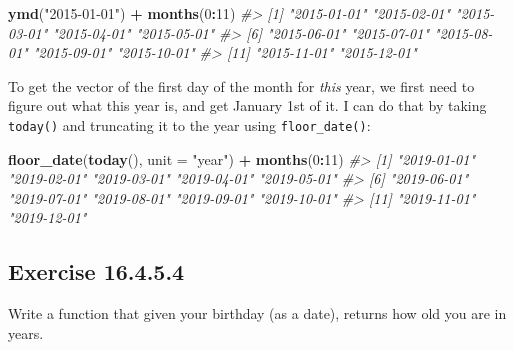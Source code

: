 \documentclass[]{book}
\newenvironment{Shaded}{\begin{snugshade}}{\end{snugshade}}
\newcommand{\CommentTok}[1]{\textcolor[rgb]{0.56,0.35,0.01}{\textit{#1}}}
\newcommand{\ControlFlowTok}[1]{\textcolor[rgb]{0.13,0.29,0.53}{\textbf{#1}}}
\newcommand{\DataTypeTok}[1]{\textcolor[rgb]{0.13,0.29,0.53}{#1}}
\newcommand{\DecValTok}[1]{\textcolor[rgb]{0.00,0.00,0.81}{#1}}
\newcommand{\KeywordTok}[1]{\textcolor[rgb]{0.13,0.29,0.53}{\textbf{#1}}}
\newcommand{\NormalTok}[1]{#1}
\newcommand{\OperatorTok}[1]{\textcolor[rgb]{0.81,0.36,0.00}{\textbf{#1}}}
\newcommand{\StringTok}[1]{\textcolor[rgb]{0.31,0.60,0.02}{#1}}
\theoremstyle{plain}
\theoremstyle{remark}
\begin{document}
\begin{Shaded}
\begin{Highlighting}[]
\KeywordTok{ymd}\NormalTok{(}\StringTok{"2015-01-01"}\NormalTok{) }\OperatorTok{+}\StringTok{ }\KeywordTok{months}\NormalTok{(}\DecValTok{0}\OperatorTok{:}\DecValTok{11}\NormalTok{)}
\CommentTok{#>  [1] "2015-01-01" "2015-02-01" "2015-03-01" "2015-04-01" "2015-05-01"}
\CommentTok{#>  [6] "2015-06-01" "2015-07-01" "2015-08-01" "2015-09-01" "2015-10-01"}
\CommentTok{#> [11] "2015-11-01" "2015-12-01"}
\end{Highlighting}
\end{Shaded}

To get the vector of the first day of the month for \emph{this} year, we first need to figure out what this year is, and get January 1st of it.
I can do that by taking \texttt{today()} and truncating it to the year using \texttt{floor\_date()}:

\begin{Shaded}
\begin{Highlighting}[]
\KeywordTok{floor_date}\NormalTok{(}\KeywordTok{today}\NormalTok{(), }\DataTypeTok{unit =} \StringTok{"year"}\NormalTok{) }\OperatorTok{+}\StringTok{ }\KeywordTok{months}\NormalTok{(}\DecValTok{0}\OperatorTok{:}\DecValTok{11}\NormalTok{)}
\CommentTok{#>  [1] "2019-01-01" "2019-02-01" "2019-03-01" "2019-04-01" "2019-05-01"}
\CommentTok{#>  [6] "2019-06-01" "2019-07-01" "2019-08-01" "2019-09-01" "2019-10-01"}
\CommentTok{#> [11] "2019-11-01" "2019-12-01"}
\end{Highlighting}
\end{Shaded}

\hypertarget{exercise-16.4.5.4}{%
\subsection*{\texorpdfstring{Exercise {16.4.5.4}}{Exercise 16.4.5.4}}\label{exercise-16.4.5.4}}

Write a function that given your birthday (as a date), returns how old you are in years.

\begin{Shaded}
\end{Shaded}
\end{document}
